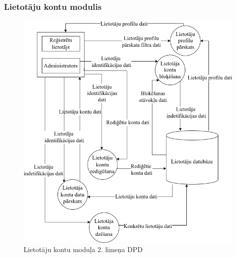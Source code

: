 \clearpage
\subsubsection{Lietotāju kontu modulis}

\begin{figure}[htbp]
	\centering
	\includegraphics[width=\linewidth]{./src/img/LietotājuKontuModulis.png}
	\caption{Lietotāju kontu moduļa 2. līmeņa DPD}
	\label{fig:dpd-2-user}
\end{figure}






